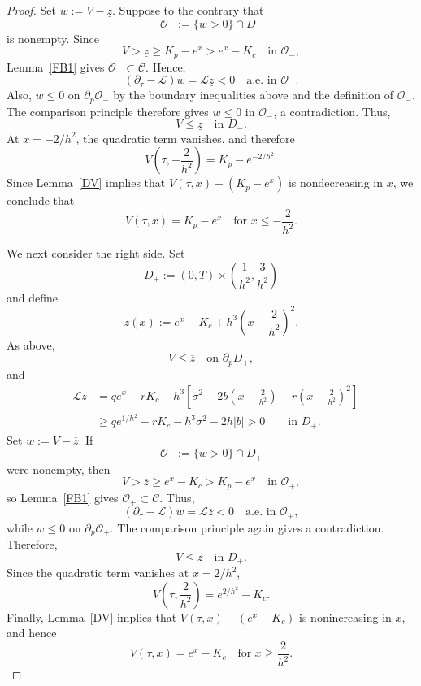 \documentclass[11pt, a4paper, leqno]{amsart}
\numberwithin{equation}{section}
\theoremstyle{plain}
\theoremstyle{definition}
\theoremstyle{remark}
\def\leq{\leqslant}
\def\geq{\geqslant}
\begin{document}
{\begin{proof}
Set $w:=V-\underline z$. Suppose to the contrary that
\[
    \mathcal O_-:=\{w>0\}\cap D_-
\]
is nonempty. Since
\[
    V>\underline z\geq K_p-e^x>e^x-K_c
    \quad\text{in }\mathcal O_-,
\]
Lemma~\ref{FB1} gives $\mathcal O_-\subset\mathcal C$. Hence,
\[
    (\partial_\tau-\mathcal L)w
    =
    \mathcal L\underline z<0
    \quad\text{a.e. in }\mathcal O_-.
\]
Also, $w\leq0$ on $\partial_p\mathcal O_-$ by the boundary
inequalities above and the definition of $\mathcal O_-$. The
comparison principle \cite[Corollary~7.4]{LIE96} therefore gives
$w\leq0$ in $\mathcal O_-$, a contradiction. Thus,
\[
    V\leq\underline z
    \quad\text{in }D_-.
\]
At $x=-2/h^2$, the quadratic term vanishes, and therefore
\[
    V\!\left(\tau,-\frac2{h^2}\right)
    =
    K_p-e^{-2/h^2}.
\]
Since Lemma~\ref{DV} implies that
$V(\tau,x)-(K_p-e^x)$ is nondecreasing in $x$, we conclude that
\[
    V(\tau,x)=K_p-e^x
    \quad\text{for }x\leq-\frac2{h^2}.
\]

We next consider the right side. Set
\[
    D_+:=(0,T)\times
    \left(\frac1{h^2},\frac3{h^2}\right)
\]
and define
\[
    \overline z(x)
    :=
    e^x-K_c
    +h^3\left(x-\frac2{h^2}\right)^2.
\]
As above,
\[
    V\leq\overline z
    \quad\text{on }\partial_pD_+,
\]
and
\[
\begin{aligned}
    -\mathcal L\overline z
    &=
    qe^x-rK_c
    -h^3\left[
        \sigma^2
        +2b\left(x-\frac2{h^2}\right)
        -r\left(x-\frac2{h^2}\right)^2
    \right] \\
    &\geq
    qe^{1/h^2}-rK_c-h^3\sigma^2-2h|b|
    >0
    \qquad\text{in }D_+.
\end{aligned}
\]
Set $w:=V-\overline z$. If
\[
    \mathcal O_+:=\{w>0\}\cap D_+
\]
were nonempty, then
\[
    V>\overline z\geq e^x-K_c>K_p-e^x
    \quad\text{in }\mathcal O_+,
\]
so Lemma~\ref{FB1} gives $\mathcal O_+\subset\mathcal C$. Thus,
\[
    (\partial_\tau-\mathcal L)w
    =
    \mathcal L\overline z<0
    \quad\text{a.e. in }\mathcal O_+,
\]
while $w\leq0$ on $\partial_p\mathcal O_+$. The comparison principle
again gives a contradiction. Therefore,
\[
    V\leq\overline z
    \quad\text{in }D_+.
\]
Since the quadratic term vanishes at $x=2/h^2$,
\[
    V\!\left(\tau,\frac2{h^2}\right)
    =
    e^{2/h^2}-K_c.
\]
Finally, Lemma~\ref{DV} implies that
$V(\tau,x)-(e^x-K_c)$ is nonincreasing in $x$, and hence
\[
    V(\tau,x)=e^x-K_c
    \quad\text{for }x\geq\frac2{h^2}.
\]
\end{proof}
}
\end{document}
